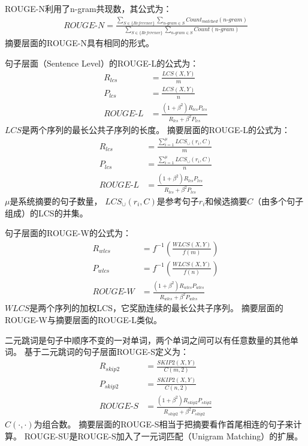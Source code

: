 ROUGE-N利用了n-gram共现数，其公式为：
\begin{align}
    \textit{ROUGE-N} = \frac{
    \sum_{S \in \{\textit{Reference}\}}
    \sum_{\textit{n-gram} \in S}
    \textit{Count}_\textit{matched}(\textit{n-gram})
    }{
    \sum_{S \in \{\textit{Reference}\}}
    \sum_{\textit{n-gram} \in S}
    \textit{Count}(\textit{n-gram})
    }
\end{align}
摘要层面的ROUGE-N具有相同的形式。

句子层面（Sentence Level）的ROUGE-L的公式为：
\begin{align}
    R_{lcs} &= \frac{\textit{LCS}(X, Y)}{m} \\
    P_{lcs} &= \frac{\textit{LCS}(X, Y)}{n} \\
    \textit{ROUGE-L} &= \frac{(1 + \beta^2) R_{lcs}P_{lcs}}
    {R_{lcs} + \beta^2 P_{lcs}}
\end{align}
$LCS$是两个序列的最长公共子序列的长度。
摘要层面的ROUGE-L的公式为：
\begin{align}
    R_{lcs} &= \frac{\sum_{i=1}^\mu \textit{LCS}_\cup(r_i, C)}{m} \\
    P_{lcs} &= \frac{\sum_{i=1}^\mu \textit{LCS}_\cup(r_i, C)}{n} \\
    \textit{ROUGE-L} &= \frac{(1 + \beta^2) R_{lcs}P_{lcs}}{R_{lcs} + \beta^2 P_{lcs}}
\end{align}
$\mu$是系统摘要的句子数量，
$\textit{LCS}_\cup(r_i, C)$是参考句子$r_i$和候选摘要$C$（由多个句子组成）的LCS的并集。

句子层面的ROUGE-W的公式为：
\begin{align}
    R_{wlcs} &= f^{-1} \left( \frac{\textit{WLCS}(X, Y)}{f(m)} \right) \\
    P_{wlcs} &= f^{-1} \left( \frac{\textit{WLCS}(X, Y)}{f(n)} \right) \\
    \textit{ROUGE-W} &= \frac{(1 + \beta^2) R_{wlcs}P_{wlcs}}{R_{wlcs} + \beta^2 P_{wlcs}}
\end{align}
$\textit{WLCS}$是两个序列的加权LCS，它奖励连续的最长公共子序列。
摘要层面的ROUGE-W与摘要层面的ROUGE-L类似。

二元跳词是句子中顺序不变的一对单词，两个单词之间可以有任意数量的其他单词。
基于二元跳词的句子层面ROUGE-S定义为：
\begin{align}
    R_{skip2} &= \frac{\textit{SKIP2}(X, Y)}{C(m, 2)} \\
    P_{skip2} &= \frac{\textit{SKIP2}(X, Y)}{C(n, 2)} \\
    \textit{ROUGE-S} &= \frac{(1 + \beta^2) R_{skip2}P_{skip2}}{R_{skip2} + \beta^2 P_{skip2}}
\end{align}
$C(\cdot, \cdot)$为组合数。
摘要层面的ROUGE-S相当于把摘要看作首尾相连的句子来计算。
ROUGE-SU是ROUGE-S加入了一元词匹配（Unigram Matching）的扩展。

